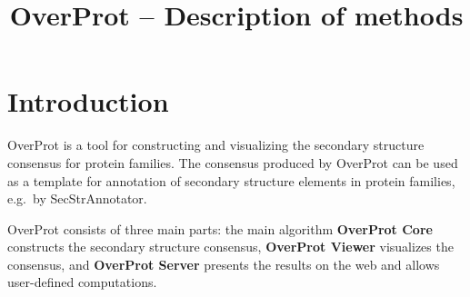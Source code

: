 \documentclass{article}
\begin{document}
\title{OverProt -- Description of methods}
\author{}
\date{}



\maketitle

\renewcommand{\contentsname}{Table of contents}
\tableofcontents
\clearpage



\section{Introduction}

OverProt is a tool for constructing and visualizing the secondary
structure consensus for protein families. The consensus produced by
OverProt can be used as a template for annotation of secondary structure
elements in protein families, e.g.~by SecStrAnnotator.

OverProt consists of three main parts: the main algorithm
\textbf{OverProt Core} constructs the secondary structure consensus,
\textbf{OverProt Viewer} visualizes the consensus, and \textbf{OverProt
Server} presents the results on the web and allows user-defined
computations.
\end{document}
